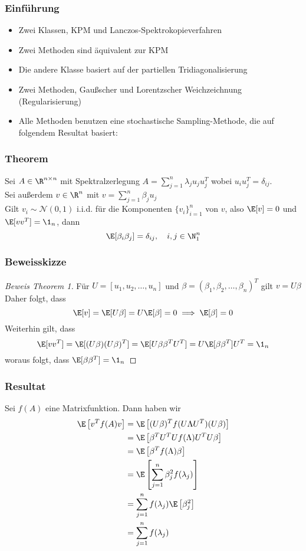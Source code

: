 \begin{frame}
    \frametitle{Einführung}
    \begin{itemize}
        \item Zwei Klassen, KPM und Lanczos-Spektrokopieverfahren
        \item Zwei Methoden sind äquivalent zur KPM
        \item Die andere Klasse basiert auf der partiellen Tridiagonalisierung
        \item Zwei Methoden, Gaußscher und Lorentzscher Weichzeichnung (Regularisierung)
        \item Alle Methoden benutzen eine stochastische Sampling-Methode, die auf folgendem Resultat basiert:
    \end{itemize}
\end{frame}

\begin{frame}
    \frametitle{Theorem}
    Sei $A \in \R^{n \times n}$ mit Spektralzerlegung $A = \sum_{j = 1}^n \lambda_j u_j u_j^T$ wobei $u_iu_j^T = \delta_{ij}$.\\
    Sei außerdem $v \in \R^n$ mit $v = \sum_{j=1}^n \beta_j u_j$\\
    Gilt $v_i \sim \mathcal{N}(0, 1)$ i.i.d. für die Komponenten $\{v_i\}_{i = 1}^n$ von $v$, also $\E[v] = 0$ und $\E[vv^T] = \1_n$, dann
    $$\E[\beta_i \beta_j] = \delta_{ij}, \quad i,j \in \N_1^n$$
\end{frame}

\begin{frame}
    \frametitle{Beweisskizze}
    \begin{proof}[Beweis Theorem 1]
        Für $U = \left[u_1, u_2, \dots, u_n\right]$ und $\beta = \left(\beta_1, \beta_2, \dots, \beta_n\right)^T$ gilt $v = U \beta$\\
        Daher folgt, dass
        $$\E[v] = \E[U\beta] = U\E[\beta] = 0 \implies \E[\beta] = 0$$
        Weiterhin gilt, dass
        $$\E[vv^T] = \E[(U\beta)(U\beta)^T] = \E[U\beta \beta^TU^T] = U \E[\beta \beta^T]U^T = \1_n$$
        woraus folgt, dass $\E[\beta \beta^T] = \1_n$
    \end{proof}
\end{frame}

\begin{frame}
    \frametitle{Resultat}
    Sei $f(A)$ eine Matrixfunktion. Dann haben wir 
    \begin{align*}
        \E\left[v^Tf(A)v\right] & = \E\left[(U\beta)^Tf(U\Lambda U^T)(U\beta)\right]\\
        & = \E\left[\beta^TU^TUf(\Lambda)U^TU\beta\right]\\
        & = \E\left[\beta^Tf(\Lambda)\beta\right]\\
        & = \E\left[\sum_{j = 1}^n \beta_j^2 f(\lambda_j) \right]\\
        & = \sum_{j = 1}^n f(\lambda_j) \E\left[ \beta_j^2 \right]\\
        & = \sum_{j = 1}^n f(\lambda_j)
    \end{align*}
\end{frame}

